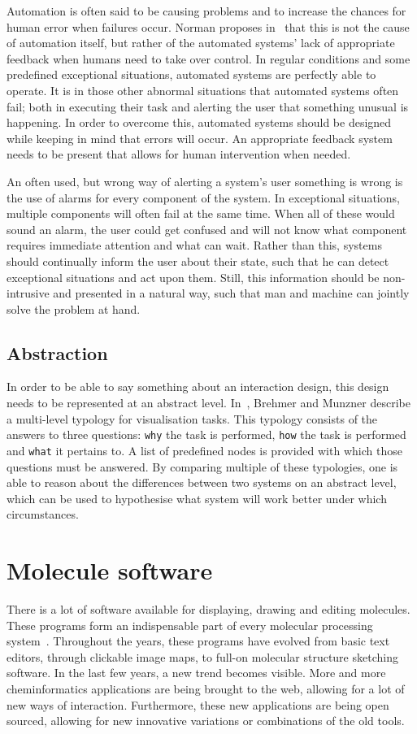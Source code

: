 Automation is often said to be causing problems and to increase the chances for human error when failures occur. Norman proposes in~\cite{norman1990problem} that this is not the cause of automation itself, but rather of the automated systems' lack of appropriate feedback when humans need to take over control. In regular conditions and some predefined exceptional situations, automated systems are perfectly able to operate. It is in those other abnormal situations that automated systems often fail; both in executing their task and alerting the user that something unusual is happening. In order to overcome this, automated systems should be designed while keeping in mind that errors will occur. An appropriate feedback system needs to be present that allows for human intervention when needed.

An often used, but wrong way of alerting a system's user something is wrong is the use of alarms for every component of the system. In exceptional situations, multiple components will often fail at the same time. When all of these would sound an alarm, the user could get confused and will not know what component requires immediate attention and what can wait. Rather than this, systems should continually inform the user about their state, such that he can detect exceptional situations and act upon them. Still, this information should be non-intrusive and presented in a natural way, such that man and machine can jointly solve the problem at hand.

\subsection{Abstraction}
In order to be able to say something about an interaction design, this design needs to be represented at an abstract level. In~\cite{brehmer2013multi}, Brehmer and Munzner describe a multi-level typology for visualisation tasks. This typology consists of the answers to three questions: \verb|why| the task is performed, \verb|how| the task is performed and \verb|what| it pertains to. A list of predefined nodes is provided with which those questions must be answered. By comparing multiple of these typologies, one is able to reason about the differences between two systems on an abstract level, which can be used to hypothesise what system will work better under which circumstances.


\section{Molecule software}
There is a lot of software available for displaying, drawing and editing molecules. These programs form an indispensable part of every molecular processing system~\cite{ertl2010molecular}. Throughout the years, these programs have evolved from basic text editors, through clickable image maps, to full-on molecular structure sketching software. In the last few years, a new trend becomes visible. More and more cheminformatics applications are being brought to the web, allowing for a lot of new ways of interaction. Furthermore, these new applications are being open sourced, allowing for new innovative variations or combinations of the old tools.

